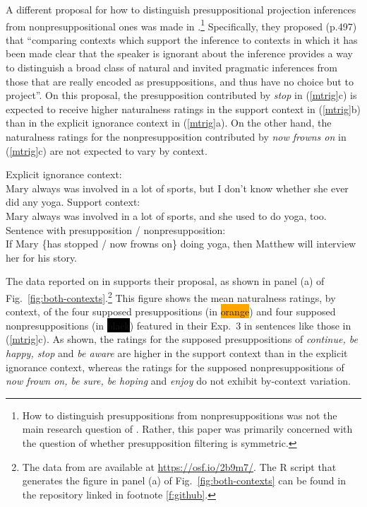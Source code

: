 \documentclass[11pt,fleqn]{article}
\newcommand{\6}{\mbox{$[\hspace*{-.6mm}[$}}
\newcommand{\9}{\mbox{$]\hspace*{-.6mm}]$}}
\begin{document}
A different proposal for how to distinguish presuppositional projection inferences from nonpresuppositional ones was made in \citealt{mandelkern-etal2020}.\footnote{How to distinguish presuppositions from nonpresuppositions was not the main research question of \citealt{mandelkern-etal2020}. Rather, this paper was primarily concerned with the question of whether presupposition filtering is symmetric.} Specifically, they proposed (p.497) that ``comparing contexts which support the inference to contexts in which it has been made clear that the speaker is ignorant about the inference provides a way to distinguish a broad class of natural and invited pragmatic inferences from those that are really encoded as presuppositions, and thus have no choice but to project''. On this proposal, the presupposition contributed by \emph{stop} in (\ref{mtrig}c) is expected to receive higher naturalness ratings in the support context in (\ref{mtrig}b) than in the explicit ignorance context in (\ref{mtrig}a). On the other hand, the naturalness ratings for the nonpresupposition contributed by \emph{now frowns on} in (\ref{mtrig}c) are not expected to vary by context. 

\begin{exe}
\ex\label{mtrig} \citealt[490f.]{mandelkern-etal2020}
\begin{xlist}
\ex Explicit ignorance context: \\ Mary always was involved in a lot of sports, but I don't know whether she ever did any yoga.
\ex Support context: \\ Mary always was involved in a lot of sports, and she used to do yoga, too.
\ex Sentence with presupposition / nonpresupposition: \\ If Mary \{has stopped / now frowns on\} doing yoga, then Matthew will interview her for his story.
\end{xlist}
\end{exe}

The data reported on in \citealt[Exp.~3]{mandelkern-etal2020} supports their proposal, as shown in panel (a) of Fig.~\ref{fig:both-contexts}.\footnote{The data from \citealt[Exp.~3]{mandelkern-etal2020} are available at \url{https://osf.io/2b9m7/}. The R script that generates the figure in panel (a) of Fig.~\ref{fig:both-contexts} can be found in the repository linked in footnote \ref{f:github}.} This figure shows the mean naturalness ratings, by context, of the four supposed presuppositions   (in \colorbox{orange}{\color{white}orange\color{black}}) and four supposed nonpresuppositions  (in \colorbox{black}{\color{white}black\color{black}}) featured in their Exp.~3 in sentences like those in (\ref{mtrig}c). As shown, the ratings for the supposed presuppositions of \emph{continue, be happy, stop} and \emph{be aware} are higher in the support context than in the explicit ignorance context, whereas the ratings for the supposed nonpresuppositions of \emph{now frown on, be sure, be hoping} and \emph{enjoy} do not exhibit by-context variation. 
\end{document}
